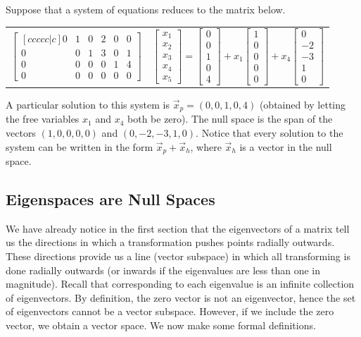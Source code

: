 \begin{example}
Suppose that a system of equations reduces to the matrix below.
\begin{center}
\begin{tabular}{cc}
$\begin{bmatrix}[ccccc|c] 0&1&0&2&0&0\\0&0&1&3&0&1\\0&0&0&0&1&4\\0&0&0&0&0&0\end{bmatrix}$
&
$\begin{bmatrix}x_1\\x_2\\x_3\\x_4\\x_5\end{bmatrix} 
= \begin{bmatrix}0\\0\\1\\0\\4\end{bmatrix}
+x_1\begin{bmatrix}1\\0\\0\\0\\0\end{bmatrix}
+x_4\begin{bmatrix}0\\-2\\-3\\1\\0\end{bmatrix}$
\end{tabular}
\end{center} 
A particular solution to this system is $\vec x_p=(0,0,1,0,4)$ (obtained by letting the free variables $x_1$ and $x_4$ both be zero).  The null space is the span of the vectors $(1,0,0,0,0)$ and $(0,-2,-3,1,0)$. Notice that every solution to the system can be written in the form $\vec x_p +\vec x_h$, where $\vec x_h$ is a vector in the null space.
\end{example}
 
\subsection{Eigenspaces are Null Spaces}
We have already notice in the first section that the eigenvectors of a matrix tell us the directions in which a transformation pushes points radially outwards.  These directions provide us a line (vector subspace) in which all transforming is done radially outwards (or inwards if the eigenvalues are less than one in magnitude).  Recall that corresponding to each eigenvalue is an infinite collection of eigenvectors. By definition, the zero vector is not an eigenvector, hence the set of eigenvectors cannot be a vector subspace.  However, if we include the zero vector, we obtain a vector space. We now make some formal definitions.

